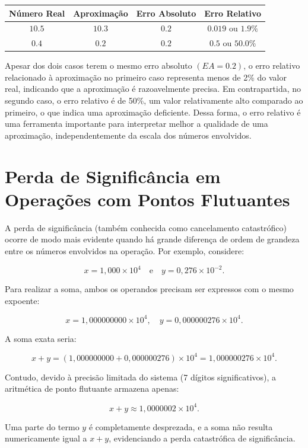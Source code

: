 \begin{center}
\small
\begin{tabular}{|c|c|c|c|}
\hline
\textbf{Número Real} & \textbf{Aproximação} & \textbf{Erro Absoluto} & \textbf{Erro Relativo}  \\
\hline
\(  10{.}5 \) & \(  10{.}3 \) & \(  0{.}2 \) & \(  0{.}019 \) ou \( 1{.}9\% \) \\
\hline
\(  0{.}4 \) & \(  0{.}2 \) & \(  0{.}2 \) & \(  0{.}5 \) ou \( 50{.}0\% \) \\
\hline
\end{tabular}
\end{center}
Apesar dos dois casos terem o mesmo erro absoluto \( (EA=  0{.}2) \), o erro relativo relacionado à aproximação no primeiro caso representa menos de 2\% do valor real, indicando que a aproximação é razoavelmente precisa. Em contrapartida, no segundo caso, o erro relativo é de 50\%, um valor relativamente alto comparado ao primeiro, o que indica uma aproximação deficiente. Dessa forma, o erro relativo é uma ferramenta importante para interpretar melhor a qualidade de uma aproximação, independentemente da escala dos números envolvidos.

\section{Perda de Significância em Operações com Pontos Flutuantes}
A perda de significância (também conhecida como cancelamento catastrófico) ocorre de modo mais evidente quando há grande diferença de ordem de grandeza entre os números envolvidos na operação. Por exemplo, considere:

\[
x = 1{,}000 \times 10^{4} \quad \text{e} \quad y = 0{,}276 \times 10^{-2}.
\]

Para realizar a soma, ambos os operandos precisam ser expressos com o mesmo expoente:

\[
x = 1{,}000000000 \times 10^4, \quad y = 0{,}000000276 \times 10^4.
\]

A soma exata seria:

\[
x + y = (1{,}000000000 + 0{,}000000276) \times 10^4 = 1{,}000000276 \times 10^4.
\]

Contudo, devido à precisão limitada do sistema (7 dígitos significativos), a aritmética de ponto flutuante armazena apenas:

\[
x + y \approx 1{,}0000002 \times 10^4.
\]

Uma parte do termo \( y \) é completamente desprezada, e a soma não resulta numericamente igual a \( x + y\), evidenciando a perda catastrófica de significância.

